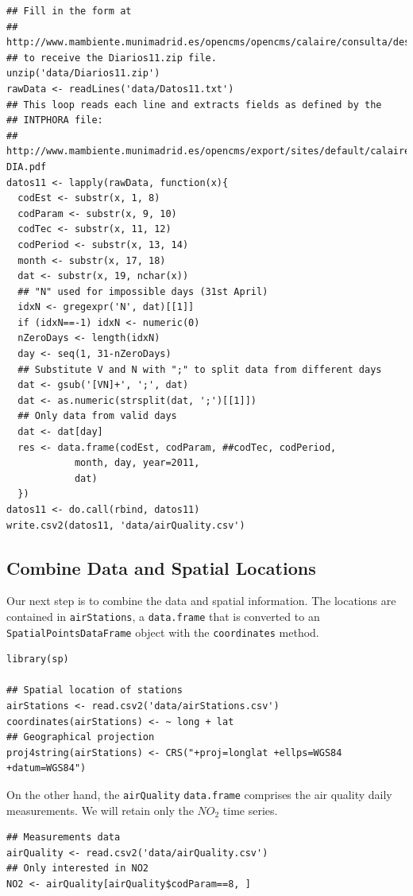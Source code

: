 \documentclass[smallroyalvopaper]{memoir}
\begin{document}
\lstset{language=R,numbers=none}
\begin{lstlisting}
## Fill in the form at
## http://www.mambiente.munimadrid.es/opencms/opencms/calaire/consulta/descarga.html
## to receive the Diarios11.zip file.
unzip('data/Diarios11.zip')
rawData <- readLines('data/Datos11.txt')
## This loop reads each line and extracts fields as defined by the
## INTPHORA file:
## http://www.mambiente.munimadrid.es/opencms/export/sites/default/calaire/Anexos/INTPHORA-DIA.pdf
datos11 <- lapply(rawData, function(x){
  codEst <- substr(x, 1, 8)
  codParam <- substr(x, 9, 10)
  codTec <- substr(x, 11, 12)
  codPeriod <- substr(x, 13, 14)
  month <- substr(x, 17, 18)
  dat <- substr(x, 19, nchar(x))
  ## "N" used for impossible days (31st April)
  idxN <- gregexpr('N', dat)[[1]]
  if (idxN==-1) idxN <- numeric(0)
  nZeroDays <- length(idxN)
  day <- seq(1, 31-nZeroDays)
  ## Substitute V and N with ";" to split data from different days
  dat <- gsub('[VN]+', ';', dat)
  dat <- as.numeric(strsplit(dat, ';')[[1]])
  ## Only data from valid days
  dat <- dat[day]
  res <- data.frame(codEst, codParam, ##codTec, codPeriod,
		    month, day, year=2011,
		    dat)
  })
datos11 <- do.call(rbind, datos11)
write.csv2(datos11, 'data/airQuality.csv')
\end{lstlisting}
\subsection{Combine Data and Spatial Locations}
\label{sec-1-2}
Our next step is to combine the data and spatial information. The
locations are contained in \texttt{airStations}, a \texttt{data.frame} that is
converted to an \texttt{SpatialPointsDataFrame} object with the \texttt{coordinates}
method.


\lstset{language=R,numbers=none}
\begin{lstlisting}
library(sp)

## Spatial location of stations
airStations <- read.csv2('data/airStations.csv')
coordinates(airStations) <- ~ long + lat
## Geographical projection
proj4string(airStations) <- CRS("+proj=longlat +ellps=WGS84 +datum=WGS84")
\end{lstlisting}

On the other hand, the \texttt{airQuality} \texttt{data.frame} comprises the air
quality daily measurements. We will retain only the $NO_2$ time
series.
\lstset{language=R,numbers=none}
\begin{lstlisting}
## Measurements data
airQuality <- read.csv2('data/airQuality.csv')
## Only interested in NO2 
NO2 <- airQuality[airQuality$codParam==8, ]
\end{lstlisting}
\end{document}
